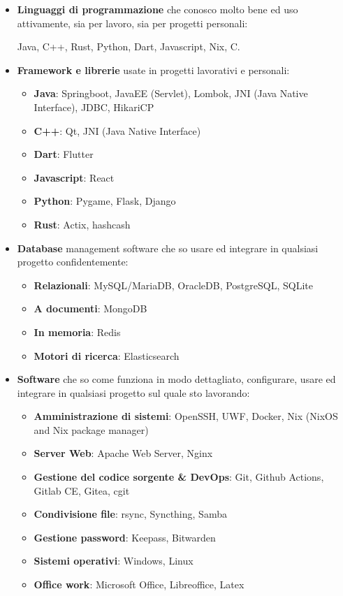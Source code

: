 \documentclass{paper}
\begin{document}
\begin{itemize}
    \item \textbf{Linguaggi di programmazione} che conosco molto bene ed uso attivamente, sia per lavoro, sia per progetti personali:

    Java, C++, Rust, Python, Dart, Javascript, Nix, C.

    \item \textbf{Framework e librerie} usate in progetti lavorativi e personali:

    \begin{itemize}
        \item \textbf{Java}: Springboot, JavaEE (Servlet), Lombok, JNI (Java Native Interface), JDBC, HikariCP
        \item \textbf{C++}: Qt, JNI (Java Native Interface)
        \item \textbf{Dart}: Flutter
        \item \textbf{Javascript}: React
        \item \textbf{Python}: Pygame, Flask, Django
        \item \textbf{Rust}: Actix, hashcash
    \end{itemize}

    \item \textbf{Database} management software che so usare ed integrare in qualsiasi progetto confidentemente:

    \begin{itemize}
        \item \textbf{Relazionali}: MySQL/MariaDB, OracleDB, PostgreSQL, SQLite
        \item \textbf{A documenti}: MongoDB
        \item \textbf{In memoria}: Redis
        \item \textbf{Motori di ricerca}: Elasticsearch
    \end{itemize}

    \item \textbf{Software} che so come funziona in modo dettagliato, configurare, usare ed integrare in qualsiasi progetto sul quale sto lavorando:

    \begin{itemize}
        \item \textbf{Amministrazione di sistemi}: OpenSSH, UWF, Docker, Nix (NixOS and Nix package manager)
        \item \textbf{Server Web}: Apache Web Server, Nginx
        \item \textbf{Gestione del codice sorgente \& DevOps}: Git, Github Actions, Gitlab CE, Gitea, cgit
        \item \textbf{Condivisione file}: rsync, Syncthing, Samba
        \item \textbf{Gestione password}: Keepass, Bitwarden
        \item \textbf{Sistemi operativi}: Windows, Linux
        \item \textbf{Office work}: Microsoft Office, Libreoffice, Latex
    \end{itemize}
\end{itemize}
\end{document}

